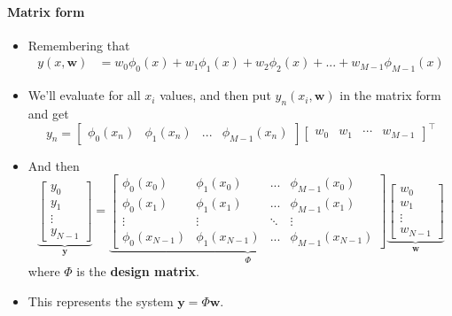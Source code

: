 \begin{frame}{\insertsubsection}
	\framesubtitle{Matrix form}
	\begin{itemize}
		\item Remembering that
			\begin{align*}
				y(x,\mathbf{w}) &= w_0 \phi_0(x) +w_1 \phi_1(x) +w_2 \phi_2(x)  + ... + w_{M-1} \phi_{M-1}(x) 
			\end{align*}
		\item We'll evaluate for all $x_i$ values, and then put $y_n(x_i,\mathbf{w})$ in the matrix form and get
		\begin{equation*}
			y_n=
			\begin{bmatrix}
				\phi_0(x_n) & \phi_1(x_n) & ... & \phi_{M-1}(x_n)
			\end{bmatrix}
			\begin{bmatrix}
				w_0 & w_1 &  \cdots & w_{M-1}
			\end{bmatrix}^{\top}
		\end{equation*}
		\item And then
		\begin{equation*}
			\underbrace{
				\begin{bmatrix}
				y_0 \\ y_1 \\  \vdots \\ y_{N-1}
				\end{bmatrix}
			}_\mathbf{y} = 
			\underbrace{
				\begin{bmatrix}
				\phi_0(x_0) & \phi_1(x_0) & ... & \phi_{M-1}(x_0)   \\ 
				\phi_0(x_1) & \phi_1(x_1) & ... & \phi_{M-1}(x_1)    \\ 
				\vdots & \vdots & \ddots & \vdots \\
				\phi_0(x_{N-1}) & \phi_1(x_{N-1}) & ... & \phi_{M-1}(x_{N-1})  
				\end{bmatrix}
			}_\Phi
			\underbrace{
				\begin{bmatrix}
				w_0 \\ w_1 \\  \vdots \\ w_{N-1}
				\end{bmatrix}
			}_\mathbf{w}
		\end{equation*}
		where $\Phi$ is the \textcolor{UniOrange}{\textbf{design matrix}}.
		\item This represents the system $\mathbf{y} = \Phi \mathbf{w}$.
\end{itemize}
\end{frame}

